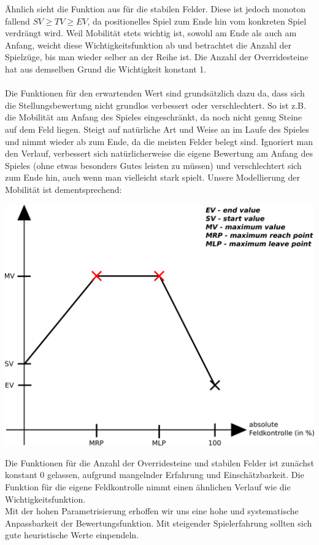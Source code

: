 Ähnlich sieht die Funktion aus für die stabilen Felder. Diese ist jedoch monoton fallend $SV \geq TV \geq EV$, da positionelles Spiel zum Ende hin vom konkreten Spiel verdrängt wird. Weil Mobilität stets wichtig ist, sowohl am Ende als auch am Anfang, weicht diese Wichtigkeitsfunktion ab und betrachtet die Anzahl der Spielzüge, bis man wieder selber an der Reihe ist. Die Anzahl der Overridesteine hat aus demselben Grund die Wichtigkeit konstant 1.\\\\
Die Funktionen für den erwartenden Wert sind grundsätzlich dazu da, dass sich die Stellungsbewertung nicht grundlos verbessert oder verschlechtert. So ist z.B. die Mobilität am Anfang des Spieles eingeschränkt, da noch nicht genug Steine auf dem Feld liegen. Steigt auf natürliche Art und Weise an im Laufe des Spieles und nimmt wieder ab zum Ende, da die meisten Felder belegt sind. Ignoriert man den Verlauf, verbessert sich natürlicherweise die eigene Bewertung am Anfang des Spieles (ohne etwas besonders Gutes leisten zu müssen) und verschlechtert sich zum Ende hin, auch wenn man vielleicht stark spielt. Unsere Modellierung der Mobilität ist dementsprechend:
\begin{center}
\includegraphics[scale=0.15]{ExpectedValueFunction.pdf}
\end{center}
Die Funktionen für die Anzahl der Overridesteine und stabilen Felder ist zunächst konstant 0 gelassen, aufgrund mangelnder Erfahrung und Einschätzbarkeit. Die Funktion für die eigene Feldkontrolle nimmt einen ähnlichen Verlauf wie die Wichtigkeitsfunktion.\\
Mit der hohen Parametrisierung erhoffen wir uns eine hohe und systematische Anpassbarkeit der Bewertungsfunktion. Mit steigender Spielerfahrung sollten sich gute heuristische Werte einpendeln.